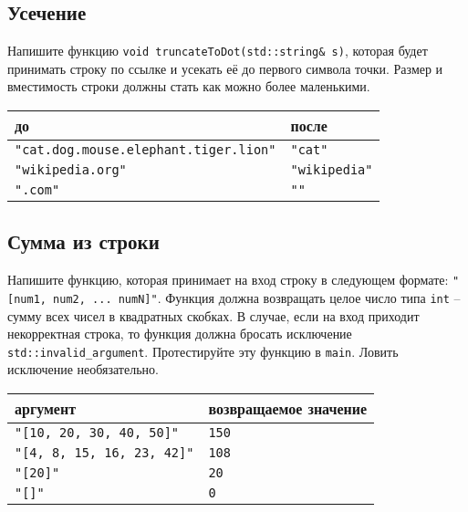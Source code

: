\documentclass{article}
\begin{document}
\subsection{Усечение}
Напишите функцию \texttt{void truncateToDot(std::string\& s)}, которая будет принимать строку по ссылке и усекать её до первого символа точки. Размер и вместимость строки должны стать как можно более маленькими.
\begin{center}
\begin{tabular}{ l | l }
 до & после \\ \hline
 \texttt{"cat.dog.mouse.elephant.tiger.lion"} & \texttt{"cat"} \\
 \texttt{"wikipedia.org"} & \texttt{"wikipedia"}  \\ 
 \texttt{".com"} & \texttt{"{}"} \\
\end{tabular}
\end{center}


\subsection{Сумма из строки}
Напишите функцию, которая принимает на вход строку в следующем формате: \texttt{"[num1, num2, ... numN]"}.
Функция должна возвращать целое число типа \texttt{int} -- сумму всех чисел в квадратных скобках. В случае, если на вход приходит некорректная строка, то функция должна бросать исключение \texttt{std::invalid\_argument}. Протестируйте эту функцию в \texttt{main}. Ловить исключение необязательно.
\begin{center}
\begin{tabular}{ l | l }
 аргумент & возвращаемое значение \\ \hline
 \texttt{"[10, 20, 30, 40, 50]"} & \texttt{150} \\
 \texttt{"[4, 8, 15, 16, 23, 42]"} & \texttt{108}  \\ 
 \texttt{"[20]"} & \texttt{20} \\
 \texttt{"[]"} & \texttt{0} \\
\end{tabular}
\end{center}
\end{document}
